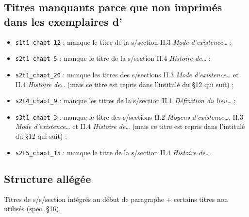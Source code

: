 \subsection[Titres non imprimés]{Titres manquants parce que non imprimés dans les exemplaires
d'\ia}\label{ann:titre-non-imprimes}

\begin{itemize}
\item
  \texttt{s1t1\_chapt\_12} : manque le titre de la s/section II.3 \textit{Mode
  d'existence\ldots{}} ;
\item
  \texttt{s2t1\_chapt\_5} : manque le titre de la s/section II.4 \textit{Histoire
  de\ldots{}} ;
\item
  \texttt{s2t1\_chapt\_20} : manque les titres des s/sections II.3 \textit{Mode
  d'existence\ldots{}} et II.4 \textit{Histoire de\ldots{}} (mais ce titre
  est repris dans l'intitulé du §12 qui suit) ;
\item
  \texttt{s2t4\_chapt\_9} : manque les titres de la s/section II.1 \textit{Définition
  du lieu\ldots{}} ;
\item
  \texttt{s3t1\_chapt\_3} : manque le titre des s/sections II.2 \textit{Moyens
  d'existence\ldots{}}, II.3 \textit{Mode d'existence\ldots{}} et II.4
  \textit{Histoire de\ldots{}} (mais ce titre est repris dans l'intitulé du
  §12 qui suit) ;
\item
  \texttt{s2t5\_chapt\_15} : manque le titre de la s/section II.4 \textit{Histoire
  de\ldots{}}.
\end{itemize}

\subsection{Structure allégée}\label{ann:structure-allegee}

Titres de s/s/section intégrés au début de paragraphe + certains titres
non utilisés (spec. §16).

